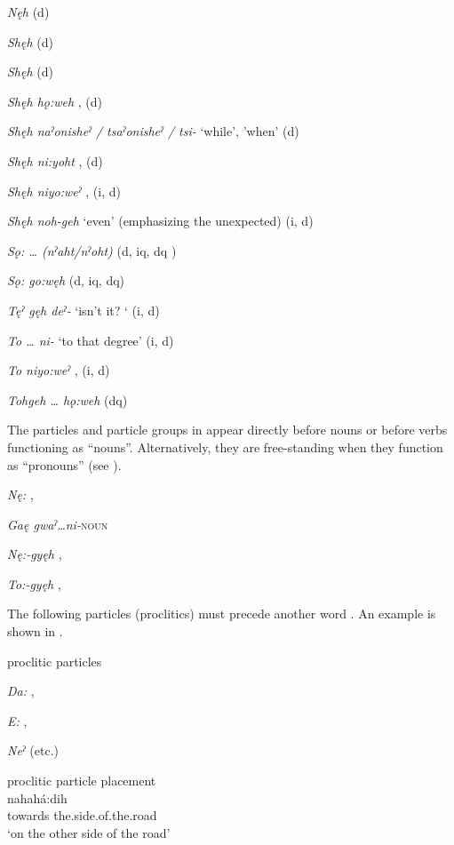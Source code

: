 \begin{multicols}{2}
\textit{Nęh}  (d)

\textit{Shęh}  (d)

\textit{Shęh}  (d)

\textit{Shęh hǫ:weh} ,  (d)

\textit{Shęh naˀonisheˀ / tsaˀonisheˀ / tsi-} ‘while’, 'when’ (d)

\textit{Shęh ni:yoht} ,  (d)

\textit{Shęh niyo:weˀ} ,  (i, d)

\textit{Shęh noh-geh} ‘even’ (emphasizing the unexpected) (i, d)

\textit{Sǫ: … (nˀaht/nˀoht)}  (d, iq, dq )

\textit{Sǫ: go:węh}  (d, iq, dq)

\textit{Tęˀ gęh deˀ-} ‘isn’t it? ` (i, d)

\textit{To … ni-} ‘to that degree’ (i, d)

\textit{To niyo:weˀ} ,  (i, d)

\textit{Tohgeh … hǫ:weh}  (dq)
\end{multicols}
\z

The particles and particle groups in  appear directly before nouns or before verbs functioning as “nouns”. Alternatively, they are free-standing when they function as “pronouns” (see ).

\ea
\label{ex:particleclauseorder10}
\textit{Nę:} , 

\textit{Gaę gwaˀ…ni-}\textsc{noun} 

\textit{Nę:-gyęh} , 

\textit{To:-gyęh} , 
\z

The following particles (proclitics) must precede another word . An example is shown in .

\ea
\label{ex:particleclauseorder6}
proclitic particles

\textit{Da:} , 

\textit{E:} , 

\textit{Neˀ}  (etc.)
\z

\ea
\label{ex:particleclauseorder61} proclitic particle placement\\
\gll {} nahahá:dih\\
towards the.side.of.the.road\\
\glt ‘on the other side of the road’
\z

